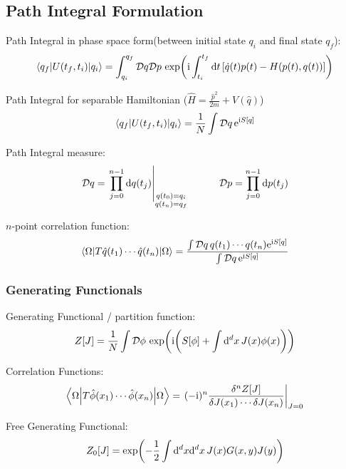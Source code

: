 	\subsection{Path Integral Formulation}
		Path Integral in phase space form(between initial state $q_i$ and final state $q_f$):
		\begin{equation}
			\mel**{q_f}{U(t_f, t_i)}{q_i} = \int_{q_i}^{q_f} \mathcal{D}q \mathcal{D}p \, \exp(\mathrm{i} \int_{t_i}^{t_f} \dd t \, \qty[ \dot{q}(t)p(t) - H\qty(p(t),q(t))])
		\end{equation}
		
		\noindent
		Path Integral for separable Hamiltonian (\ie $\hat{H} = \frac{\hat{p}^2}{2m} + V(\hat{q})$)
		\begin{equation}
			\mel**{q_f}{U(t_f, t_i)}{q_i} = \frac{1}{N} \int \mathcal{D}q \, \mathrm{e}^{\mathrm{i} S[q]}
		\end{equation}
		
		\noindent
		Path Integral measure:
		\begin{equation}
			\mathcal{D}q = \eval{\prod_{j=0}^{n-1} \dd q(t_j)}_{\substack{q(t_0)=q_i\\q(t_n)=q_f}}
			\hsp
			\mathcal{D}p = \prod_{j=0}^{n-1} \dd p(t_j)
		\end{equation}
		
		\noindent
		$n$-point correlation function:
		\begin{equation}
			\mel**{\Omega}{T\hat{q}(t_1)\dotsb\hat{q}(t_n)}{\Omega} = \frac{\int\mathcal{D}q\,q(t_1)\dotsb q(t_n)\mathrm{e}^{\mathrm{i} S \qty[q]}}{\int\mathcal{D}q\,\mathrm{e}^{\mathrm{i} S\qty[q]}}
		\end{equation}

		\subsubsection{Generating Functionals}
			Generating Functional / partition function:
			\begin{equation}
				Z[J] = \frac{1}{N} \int \mathcal{D}\phi\, \exp(\mathrm{i}\qty(S[\phi] + \int \dd^d x \, J(x) \phi(x)))
			\end{equation}
			
			\noindent
			Correlation Functions:
			\begin{equation}
				\mel**{\Omega}{T \hat{\phi}(x_1) \dotsb \hat{\phi}(x_n)}{\Omega} = \eval{(-\i)^{n} \frac{\delta^n Z[J]}{\delta J(x_1) \dotsb \delta J(x_n)}}_{J=0}
			\end{equation}

			\noindent
			Free Generating Functional:
			\begin{equation}
				Z_0\qty[J] = \exp(-\frac{1}{2}\int\dd^d x \dd^d x\, J(x) G(x,y)J(y))
			\end{equation}

